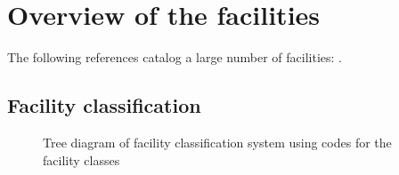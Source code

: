 %
\chapter{Overview of the facilities}
\label{chp:overview-facilities}

The following references catalog a large number of facilities:
\citet{PirrelloCJ+1971+eng+RPRT+V1,PenarandaFE+1985+eng+RPRT+V1,GoodrichM+2008+eng+RPRT+Western,GoodrichM+2008+eng+RPRT+Eastern}.


\section{Facility classification}



\begin{figure}
    \centering
    
    \caption{Tree diagram of facility classification system using codes for the
    facility classes}
\end{figure}
